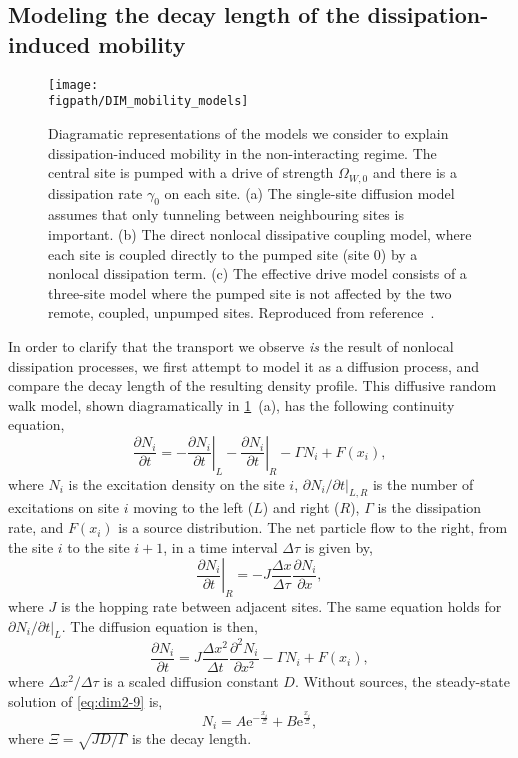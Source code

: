 \subsection{Modeling the decay length of the dissipation-induced mobility}
\begin{figure}[ht!]
\centering 
\texttt{[image: \\figpath/DIM\_mobility\_models]}
\caption{\label{fig:dim2-4}Diagramatic representations of the models we consider to explain dissipation-induced mobility in the non-interacting regime. The central site is pumped with a drive of strength \(\Omega_{W,0}\) and there is a dissipation rate \(\gamma_{0}\) on each site. (a) The single-site diffusion model assumes that only tunneling between neighbouring sites is important. (b) The direct nonlocal dissipative coupling model, where each site is coupled directly to the pumped site (site 0) by a nonlocal dissipation term. (c) The effective drive model consists of a three-site model where the pumped site is not affected by the two remote, coupled, unpumped sites. Reproduced from reference~\cite{Owen2017}.}
\end{figure}
In order to clarify that the transport we observe \emph{is} the result of nonlocal dissipation processes, we first attempt to model it as a diffusion process, and compare the decay length of the resulting density profile. This diffusive random walk model, shown diagramatically in \cref{fig:dim2-4}~(a), has the following continuity equation,
\begin{equation}
	\frac{\partial N_{i}}{\partial t} = - \left.\frac{\partial N_{i}}{\partial t}\right|_{L} - \left.\frac{\partial N_{i}}{\partial t}\right|_{R} - \Gamma N_{i} + F(x_{i}),
	\label{eq:dim2-7}
\end{equation}
where \(N_{i}\) is the excitation density on the site \(i\), \(\partial N_{i} / \partial t|_{L,R}\) is the number of excitations on site \(i\) moving to the left (\(L\)) and right (\(R\)), \(\Gamma\) is the dissipation rate, and \(F(x_{i})\) is a source distribution. The net particle flow to the right, from the site \(i\) to the site \(i+1\), in a time interval \(\Delta \tau\) is given by,
\begin{equation}
	\left.\frac{\partial N_{i}}{\partial t}\right|_{R} = -J\frac{\Delta x}{\Delta \tau}\frac{\partial N_{i}}{\partial x},
	\label{eq:dim2-8}
\end{equation}
where \(J\) is the hopping rate between adjacent sites. The same equation holds for \(\partial N_{i}/\partial t|_{L}\). The diffusion equation is then,
\begin{equation}
	\frac{\partial N_{i}}{\partial t} = J\frac{\Delta x^{2}}{\Delta t}\frac{\partial^{2} N_{i}}{\partial x^{2}} - \Gamma N_{i} + F(x_{i}),	
	\label{eq:dim2-9}
\end{equation}
where \(\Delta x^{2}/\Delta \tau\) is a scaled diffusion constant \(D\). Without sources, the steady-state solution of \cref{eq:dim2-9} is,
\begin{equation}
	N_{i} = A\mathrm{e}^{-\frac{x_{i}}{\Xi}} + B\mathrm{e}^{\frac{x_{i}}{\Xi}},
	\label{eq:dim2-10}
\end{equation}
where \(\Xi = \sqrt{JD/\Gamma}\) is the decay length.


